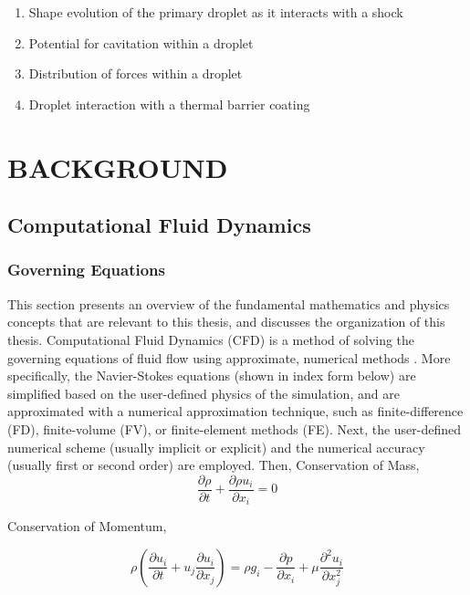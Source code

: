 \documentclass{UCF_ETD}
\begin{document}
\begin{enumerate}
    \item Shape evolution of the primary droplet as it interacts with a shock
    \item Potential for cavitation within a droplet
    \item Distribution of forces within a droplet
    \item Droplet interaction with a thermal barrier coating
\end{enumerate}

\chapter{BACKGROUND} 
\section{Computational Fluid Dynamics}
\subsection{Governing Equations}
\label{sec:governingEquations}

This section presents an overview of the fundamental mathematics and physics concepts that are relevant to this thesis, and discusses the organization of this thesis. Computational Fluid Dynamics (CFD) is a method of solving the governing equations of fluid flow using approximate, numerical methods \cite{Anderson1995}. More specifically, the Navier-Stokes equations (shown in index form below) are simplified based on the user-defined physics of the simulation, and are approximated with a numerical approximation technique, such as finite-difference (FD), finite-volume (FV), or finite-element methods (FE). Next, the user-defined numerical scheme (usually implicit or explicit) and the numerical accuracy (usually first or second order) are employed. Then, Conservation of Mass,
\begin{equation}
    \frac{\partial \rho}{\partial t} + \frac{\partial \rho u_{i}}{\partial x_{i}} = 0
    \label{eq:ConsMom}
\end{equation}

Conservation of Momentum, 

\begin{equation}
        \rho\left(\frac{\partial u_i}{\partial t}+u_j\frac{\partial u_i}{\partial x_j}\right)=\rho g_i-\frac{\partial p}{\partial x_i}+\mu\frac{\partial^2u_i}{\partial x_j^2}    
        \label{eq:ConsMass}
\end{equation}
\end{document}
